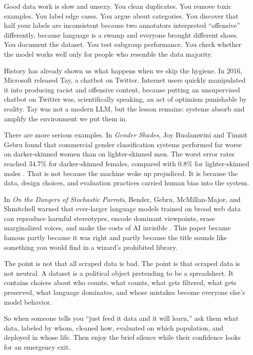 \documentclass[12pt,oneside]{book}
\begin{document}
Good data work is slow and unsexy. You clean duplicates. You remove toxic examples. You label edge cases. You argue about categories. You discover that half your labels are inconsistent because two annotators interpreted ``offensive'' differently, because language is a swamp and everyone brought different shoes. You document the dataset. You test subgroup performance. You check whether the model works well only for people who resemble the data majority.

History has already shown us what happens when we skip the hygiene. In 2016, Microsoft released Tay, a chatbot on Twitter. Internet users quickly manipulated it into producing racist and offensive content, because putting an unsupervised chatbot on Twitter was, scientifically speaking, an act of optimism punishable by reality. Tay was not a modern LLM, but the lesson remains: systems absorb and amplify the environment we put them in.

There are more serious examples. In \emph{Gender Shades}, Joy Buolamwini and Timnit Gebru found that commercial gender classification systems performed far worse on darker-skinned women than on lighter-skinned men. The worst error rates reached 34.7\% for darker-skinned females, compared with 0.8\% for lighter-skinned males \parencite{buolamwini2018}. That is not because the machine woke up prejudiced. It is because the data, design choices, and evaluation practices carried human bias into the system.

In \emph{On the Dangers of Stochastic Parrots}, Bender, Gebru, McMillan-Major, and Shmitchell warned that ever-larger language models trained on broad web data can reproduce harmful stereotypes, encode dominant viewpoints, erase marginalized voices, and make the costs of AI invisible \parencite{bender2021}. This paper became famous partly because it was right and partly because the title sounds like something you would find in a wizard's prohibited library.

The point is not that all scraped data is bad. The point is that scraped data is not neutral. A dataset is a political object pretending to be a spreadsheet. It contains choices about who counts, what counts, what gets filtered, what gets preserved, what language dominates, and whose mistakes become everyone else's model behavior.

So when someone tells you ``just feed it data and it will learn,'' ask them what data, labeled by whom, cleaned how, evaluated on which population, and deployed in whose life. Then enjoy the brief silence while their confidence looks for an emergency exit.
\end{document}
